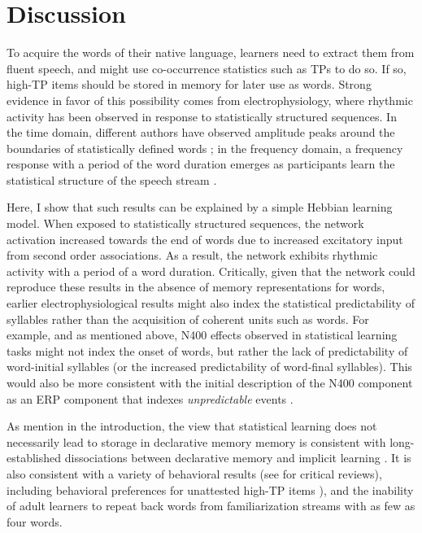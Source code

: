 \documentclass[
]{article}
\begin{document}
\clearpage

\hypertarget{discussion}{%
\section{Discussion}\label{discussion}}

To acquire the words of their native language, learners need to extract
them from fluent speech, and might use co-occurrence statistics such as
TPs to do so. If so, high-TP items should be stored in memory for later
use as words. Strong evidence in favor of this possibility comes from
electrophysiology, where rhythmic activity has been observed in response
to statistically structured sequences. In the time domain, different
authors have observed amplitude peaks around the boundaries of
statistically defined words
\citep{Abla2008, Cunillera2006, Kudo2011, Sanders2002, Teinonen2009}; in
the frequency domain, a frequency response with a period of the word
duration emerges as participants learn the statistical structure of the
speech stream
\citep{Buiatti2009, Batterink2017, Flo2022, Kabdebon2015, Moreau2022, Moser2021}.

Here, I show that such results can be explained by a simple Hebbian
learning model. When exposed to statistically structured sequences, the
network activation increased towards the end of words due to increased
excitatory input from second order associations. As a result, the
network exhibits rhythmic activity with a period of a word duration.
Critically, given that the network could reproduce these results in the
absence of memory representations for words, earlier
electrophysiological results might also index the statistical
predictability of syllables rather than the acquisition of coherent
units such as words. For example, and as mentioned above, N400 effects
observed in statistical learning tasks
\citep{Abla2008, Cunillera2006, Kudo2011, Sanders2002, Teinonen2009}
might not index the onset of words, but rather the lack of
predictability of word-initial syllables (or the increased
predictability of word-final syllables). This would also be more
consistent with the initial description of the N400 component as an ERP
component that indexes \emph{unpredictable} events \citep{Kutas2000}.

As mention in the introduction, the view that statistical learning does
not necessarily lead to storage in declarative memory memory is
consistent with long-established dissociations between declarative
memory and implicit learning
\citetext{\citealp{Cohen1980}; \citealp{Finn2016}; \citealp[\citet{Knowlton1996a}]{Graf1984}; \citealp{Poldrack2001}; \citealp{Squire1992}}.
It is also consistent with a variety of behavioral results (see
\citep[\citet{Endress-stat-recall}]{Endress2020} for critical reviews),
including behavioral preferences for unattested high-TP items
\citep{Endress-Action-Axc, Endress-Phantoms-Vision, Endress-Phantoms, Jones2007, Turk-Browne-reversal}),
and the inability of adult learners to repeat back words from
familiarization streams with as few as four
words\citep{Endress-stat-recall}.
\end{document}
